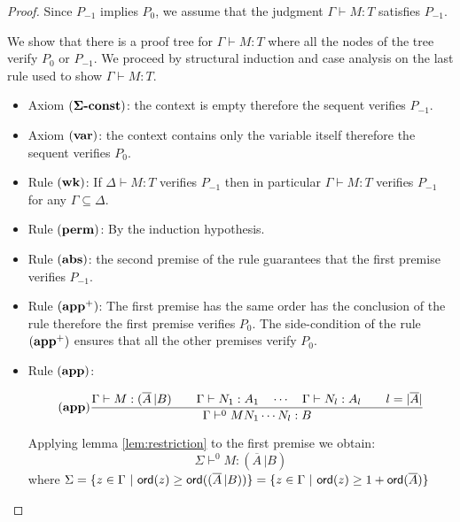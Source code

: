\begin{proof}
Since $P_{-1}$ implies $P_0$, we assume that the judgment $\Gamma \vdash M : T$ satisfies $P_{-1}$.

We show that there is a proof tree for
$\Gamma \vdash M : T$ where all the nodes of the tree verify $P_0$
or $P_{-1}$. We proceed by structural induction and case analysis on the last rule used
to show $\Gamma \vdash M : T$.
\begin{itemize}
\item Axiom $\mathbf{(\Sigma\mbox{\textbf{-const}})}$: the context is empty therefore the sequent verifies $P_{-1}$.

\item Axiom $\mathbf{(var)}$: the context contains only the variable itself therefore the sequent verifies $P_0$.

\item Rule $\mathbf{(wk)}$: If $\Delta \vdash M : T$ verifies $P_{-1}$ then in particular $\Gamma
\vdash M : T$ verifies $P_{-1}$ for any $\Gamma \subseteq \Delta$.

\item Rule $\mathbf{(perm)}$: By the induction hypothesis.


\item Rule $\mathbf{(abs)}$: the second premise of the rule guarantees that the first
premise verifies $P_{-1}$.

\item Rule $\mathbf{(app^+)}$: The first premise has the same order has the
conclusion of the rule therefore the first premise verifies
$P_0$. The side-condition of the rule $\mathbf{(app^+)}$ ensures that all the other premises verify $P_0$.

\item Rule $\mathbf{(app)}$:

$$ \mathbf{(app)}
    \frac{\displaystyle 
        { \Gamma \vdash M : (\overline{A} \, | B)
        \qquad
        \Gamma \vdash N_1 : A_1 \quad \cdots \quad \Gamma \vdash N_{l} : A_l \qquad l = |\overline{A}|
        }
    }{
        \Gamma \vdash^0 M N_1 \cdots N_{l} : B
    }
$$

Applying lemma \ref{lem:restriction} to the first premise we obtain:
\begin{equation}
 \Sigma \vdash^0 M : (\overline{A} \, | B) \label{eq:seq1}
\end{equation}
where $\Sigma = \{ z \in \Gamma \ | \ {\sf ord}(z) \geq {\sf ord}((\overline{A} \, | B)) \} = \{ z \in \Gamma \ | \ {\sf ord}(z) \geq 1 + {\sf ord}(\overline{A}) \} $


\end{itemize}
\end{proof}
